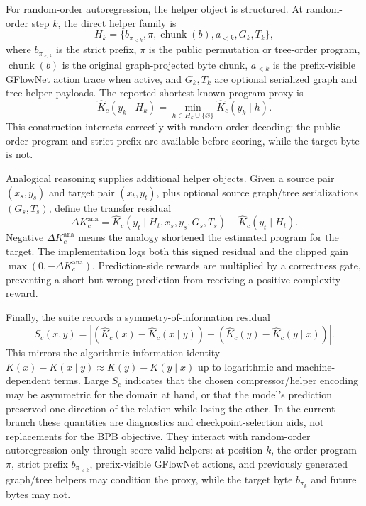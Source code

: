 \documentclass[11pt]{article}
\theoremstyle{definition}
\theoremstyle{plain}
\theoremstyle{remark}
\numberwithin{equation}{section}
\begin{document}
For random-order autoregression, the helper object is structured.  At random-order step $k$, the direct helper family is
\begin{equation}
  H_k=\{b_{\pi_{<k}},\pi,\operatorname{chunk}(b),a_{<k},G_k,T_k\},
\end{equation}
where $b_{\pi_{<k}}$ is the strict prefix, $\pi$ is the public permutation or tree-order program, $\operatorname{chunk}(b)$ is the original graph-projected byte chunk, $a_{<k}$ is the prefix-visible GFlowNet action trace when active, and $G_k,T_k$ are optional serialized graph and tree helper payloads.  The reported shortest-known program proxy is
\begin{equation}
  \widehat K_c(y_k\mid H_k)
  =\min_{h\in H_k\cup\{\varnothing\}}\widehat K_c(y_k\mid h).
\end{equation}
This construction interacts correctly with random-order decoding: the public order program and strict prefix are available before scoring, while the target byte is not.

Analogical reasoning supplies additional helper objects.  Given a source pair $(x_s,y_s)$ and target pair $(x_t,y_t)$, plus optional source graph/tree serializations $(G_s,T_s)$, define the transfer residual
\begin{equation}
  \Delta K_c^{\mathrm{ana}}
  =
  \widehat K_c(y_t\mid H_t,x_s,y_s,G_s,T_s)
  -
  \widehat K_c(y_t\mid H_t).
\end{equation}
Negative $\Delta K_c^{\mathrm{ana}}$ means the analogy shortened the estimated program for the target.  The implementation logs both this signed residual and the clipped gain $\max(0,-\Delta K_c^{\mathrm{ana}})$.  Prediction-side rewards are multiplied by a correctness gate, preventing a short but wrong prediction from receiving a positive complexity reward.

Finally, the suite records a symmetry-of-information residual
\begin{equation}
  S_c(x,y)
  =
  \left|(\widehat K_c(x)-\widehat K_c(x\mid y))
  -(\widehat K_c(y)-\widehat K_c(y\mid x))\right|.
\end{equation}
This mirrors the algorithmic-information identity $K(x)-K(x\mid y)\approx K(y)-K(y\mid x)$ up to logarithmic and machine-dependent terms.  Large $S_c$ indicates that the chosen compressor/helper encoding may be asymmetric for the domain at hand, or that the model's prediction preserved one direction of the relation while losing the other.  In the current branch these quantities are diagnostics and checkpoint-selection aids, not replacements for the BPB objective.  They interact with random-order autoregression only through score-valid helpers: at position $k$, the order program $\pi$, strict prefix $b_{\pi_{<k}}$, prefix-visible GFlowNet actions, and previously generated graph/tree helpers may condition the proxy, while the target byte $b_{\pi_k}$ and future bytes may not.
\end{document}
